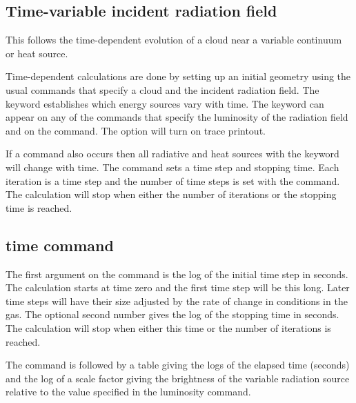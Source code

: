 \begin{shaded}
\section{\protect\experimental Time-variable incident radiation field}
\label{sec:TimeVariableRadiationFields}

This follows the time-dependent evolution of a cloud near a variable
continuum or heat source.

Time-dependent calculations are done by setting up an initial geometry
using the usual commands that specify a cloud and
the incident radiation field.
The  keyword establishes which energy sources
vary with time.
The keyword can appear on any of the commands that specify the
luminosity of the radiation field and
on the  command.
The  option will turn on trace printout.

If a  command also occurs
then all radiative and heat sources with
the  keyword will change with time.
The  command sets a time step
and stopping time.
Each iteration is a time step and the number of time
steps is set with the  command.
The calculation will stop when
either the number of iterations or the stopping time is reached.

\subsection{time command}

The first argument on the  command
is the log of the initial time step in seconds.
The calculation starts at time zero and
the first time step will be this long.
Later time steps will
have their size adjusted by the rate of change in conditions in the gas.
The optional second number gives the log of the stopping
time in seconds.
The calculation will stop when either this time or the number of iterations is reached.

The  command is followed by a table giving the logs of
the elapsed time (seconds) and the log of a scale factor giving the
brightness of the variable radiation source relative to the value
specified in the luminosity command.  


\end{shaded}
